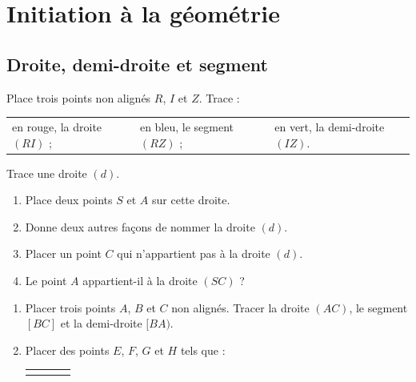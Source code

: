 \documentclass[a4paper,10pt]{report}
\begin{document}

\newpage
\section*{Initiation à la géométrie}

\subsection*{Droite, demi-droite et segment}

\begin{ex}
Place trois points non alignés $R$, $I$ et $Z$. Trace :
\begin{enumerate}
\begin{tabular}{m{5cm}m{5cm}m{5cm}}
\item en rouge, la droite $(RI)$ ;&
\item en bleu, le segment $(RZ)$ ;&
\item en vert, la demi-droite $(IZ)$.\\
\end{tabular}
\end{enumerate}
\end{ex}

\begin{ex}
Trace une droite $(d)$.
\begin{enumerate}
\item Place deux points $S$ et $A$ sur cette droite.
\item Donne deux autres façons de nommer la droite $(d)$.
\item Placer un point $C$ qui n'appartient pas à la droite $(d)$.
\item Le point $A$ appartient-il à la droite $(SC)$ ?
\end{enumerate}
\end{ex}

\begin{ex}

\medskip
\begin{enumerate}
\item Placer trois points $A$, $B$ et $C$ non alignés. Tracer la droite $(AC)$, le segment $[BC]$ et la demi-droite $[BA)$.
\item Placer des points $E$, $F$, $G$ et $H$ tels que :
\begin{enumerate}
\begin{tabular}{m{2.5cm}m{2.5cm}m{4cm}m{4cm}}
\item[•] $E \in(AC)$&
\item[•]$F \in [BC]$&
\item[•]$G$ appartient à $[BA)$&
\item[•]$H$ appartient à $[AB)$\\
\end{tabular}
\end{enumerate}
\end{enumerate}
\end{ex}
\end{document}
